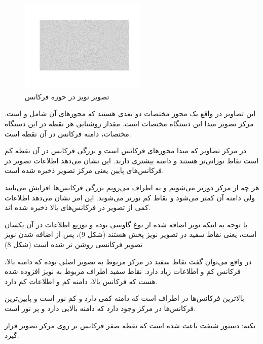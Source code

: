 {    \begin{figure}[H]
        \includegraphics[width=6cm]{Images/FT_noise.jpg}
        \centering
        \caption{تصویر نویز در حوزه فرکانس}
    \end{figure}
    
    این تصاویر در واقع یک محور مختصات دو بعدی هستند که محور‌های آن شامل 
     و  است.
    مرکز تصویر مبدا این دستگاه مختصات است.
    مقدار روشنایی هر نقطه در این دستگاه مختصات، دامنه
    فرکانس در آن نقطه است.
    
    در مرکز تصاویر که مبدا محور‌های فرکانس است و بزرگی فرکانس در آن نقطه کم است نقاط نورانی‌تر هستند و دامنه بیشتری دارند. این نشان می‌دهد اطلاعات تصویر در فرکانس‌های پایین یعنی مرکز تصویر ذخیره شده است.
    
    
    هر چه از مرکز دورتر می‌شویم و به اطراف می‌رویم بزرگی فرکانس‌ها افزایش می‌یابند ولی دامنه آن کمتر می‌شود و نقاط کم نورتر می‌شوند. این امر نشان می‌دهد اطلاعات کمی از تصویر در فرکانس‌های بالا ذخیره شده اند.
    
    با توجه به اینکه نویز اضافه شده از نوع گاوسی بوده و توزیع اطلاعات در آن یکسان است، یعنی نقاط سفید در تصویر نویز پخش هستند (شکل 9)، پس از اضافه شدن نویز تصویر فرکانسی روشن تر شده است (شکل 8)
    
    در واقع می‌توان گفت نقاط سفید در مرکز مربوط به تصویر اصلی بوده که دامنه بالا، فرکانس کم و اطلاعات زیاد دارد.
    نقاط سفید اطراف مربوط به نویز افزوده شده هست که فرکانس بالا، دامنه کم و اطلاعات کم دارد.
    
    بالاترین فرکانس‌ها در اطراف است که دامنه کمی دارد و کم نور است و پایین‌ترین فرکانس‌ها در مرکز وجود دارد که دامنه بالایی دارد و پر نور است.
    
    نکته: دستور شیفت باعث شده است که نقطه صفر فرکانس بر روی مرکز تصویر قرار گیرد.
}